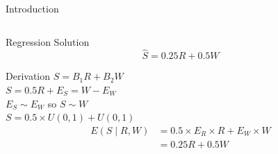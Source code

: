 \documentclass{beamer}
\begin{document}
\begin{frame}{Introduction}
\begin{columns}
\begin{column}{.48\textwidth}
{\begin{block}{Regression Solution}
					\[
						\hat{S} = 0.25R + 0.5W
					\]
				\end{block}
				\begin{block}{Derivation}
					$S = B_{1}R + B_{2}W$\\
					$S = 0.5R+E_{S}=W-E_{W}$ \\
					$E_{S} \sim E_{W}$ so $S \sim W$ \\
					$S=0.5 \times U(0,1) + U(0,1)$ \\
					\vspace{-0.5cm}
					\begin{align*}
						E(S \mid R, W) & = 0.5 \times E_{R} \times R + E_{W} \times W \\
						               & = 0.25R + 0.5W
					\end{align*}
				\end{block}
			}
		\end{column}
	\end{columns}
\end{frame}
\end{document}
